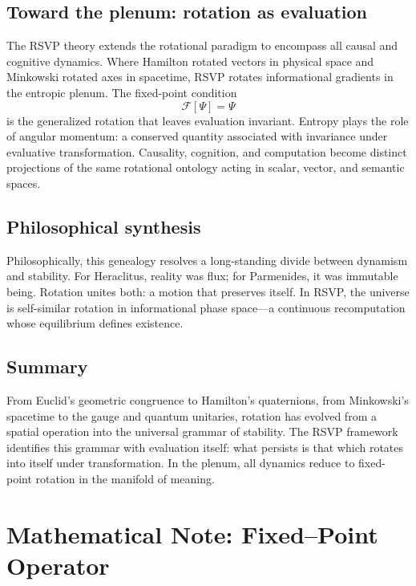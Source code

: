 \documentclass[12pt,a4paper]{article}
\newcommand{\F}{\mathcal{F}}          %
\theoremstyle{plain}
\begin{document}
\subsection{Toward the plenum: rotation as evaluation}
The RSVP theory extends the rotational paradigm to encompass all causal and cognitive dynamics.
Where Hamilton rotated vectors in physical space and Minkowski rotated axes in spacetime, RSVP rotates informational gradients in the entropic plenum.
The fixed-point condition
\[
\F[\Psi] = \Psi
\]
is the generalized rotation that leaves evaluation invariant.  
Entropy plays the role of angular momentum: a conserved quantity associated with invariance under evaluative transformation.
Causality, cognition, and computation become distinct projections of the same rotational ontology acting in scalar, vector, and semantic spaces.

\subsection{Philosophical synthesis}
Philosophically, this genealogy resolves a long-standing divide between dynamism and stability.
For Heraclitus, reality was flux; for Parmenides, it was immutable being.
Rotation unites both: a motion that preserves itself.  
In RSVP, the universe is self-similar rotation in informational phase space—a continuous recomputation whose equilibrium defines existence.

\subsection{Summary}
From Euclid’s geometric congruence to Hamilton’s quaternions, from Minkowski’s spacetime to the gauge and quantum unitaries, rotation has evolved from a spatial operation into the universal grammar of stability.  
The RSVP framework identifies this grammar with evaluation itself:
what persists is that which rotates into itself under transformation.
In the plenum, all dynamics reduce to fixed-point rotation in the manifold of meaning.



\section{Mathematical Note: Fixed--Point Operator}
\label{app:fixed-point-operator}
\end{document}
